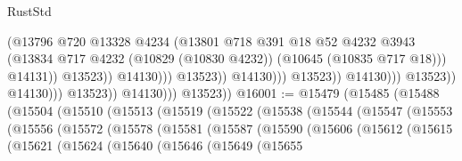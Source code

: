 \begin{lexlean}{RustStd}
\begin{coremodule}
                                                          (@13796
                                                            @720
                                                            @13328
                                                            @4234
                                                            (@13801
                                                              @718
                                                              @391
                                                              @18
                                                              @52
                                                              @4232
                                                              @3943
                                                              (@13834
                                                                @717
                                                                @4232
                                                                (@10829 (@10830 @4232))
                                                                (@10645 (@10835 @717 @18)))
                                                              @14131))
                                                          @13523))
                                                      @14130)))
                                                @13523))
                                            @14130)))
                                      @13523))
                                  @14130)))
                            @13523))
                        @14130)))
                  @13523))
              @14130)))
        @13523))
@16001 := @15479
    (@15485
      (@15488
        (@15504
          (@15510
            (@15513
              (@15519
                (@15522
                  (@15538
                    (@15544
                      (@15547
                        (@15553
                          (@15556
                            (@15572
                              (@15578
                                (@15581
                                  (@15587
                                    (@15590
                                      (@15606
                                        (@15612
                                          (@15615
                                            (@15621
                                              (@15624
                                                (@15640
                                                  (@15646
                                                    (@15649
                                                      (@15655

\end{coremodule}
\end{lexlean}
